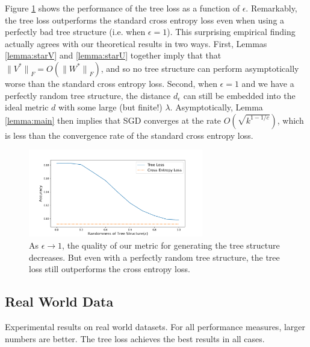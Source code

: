\documentclass[twoside]{article}
\renewcommand{\star}[1]{{#1}^{*}}
\newcommand{\lF}[1]{{\lVert {#1} \rVert}_F}
\newcommand{\fixme}[1]{}
\begin{document}
Figure \ref{fig:synth:eps} shows the performance of the tree loss as a function of $\epsilon$.
Remarkably, the tree loss outperforms the standard cross entropy loss even when using a perfectly bad tree structure (i.e. when $\epsilon=1$).
This surprising empirical finding actually agrees with our theoretical results in two ways.
First, Lemmas \ref{lemma:starV} and \ref{lemma:starU} together imply that that $\lF{\star V} = O(\lF{\star W})$,
and so no tree structure can perform asymptotically worse than the standard cross entropy loss.
Second, when $\epsilon=1$ and we have a perfectly random tree structure,
the distance $d_\epsilon$ can still be embedded into the ideal metric $d$ with some large (but finite!) $\lambda$.
Asymptotically, Lemma \ref{lemma:main} then implies that SGD converges at the rate $O(\sqrt{k^{1-1/c}})$,
which is less than the convergence rate of the standard cross entropy loss.
\fixme{replace lemma with theorem}

\begin{figure}
\includegraphics[width=\columnwidth,height=1.5in]{fig/new_img/loss_vs_structure.png}
\caption{
As $\epsilon\to1$, the quality of our metric for generating the tree structure decreases.
But even with a perfectly random tree structure,
the tree loss still outperforms the cross entropy loss.
}  
\label{fig:synth:eps}
\end{figure}




\subsection{Real World Data}

\begin{table}
    \centering
    
    \caption{Experimental results on real world datasets.  For all performance measures, larger numbers are better.  The tree loss achieves the best results in all cases.}
    \label{table:results}
\end{table}
\end{document}
